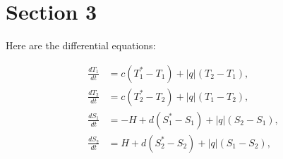 \section{Section 3}

Here are the differential equations:

\begin{equation*}
\begin{split}
\frac{dT_1}{dt} &= c(T_1^* - T_1) + |q| (T_2 - T_1) , \\
\frac{dT_2}{dt} &= c(T_2^* - T_2) + |q| (T_1 - T_2) , \\
\frac{dS_1}{dt} &= -H + d(S_1^* - S_1) + |q| (S_2 - S_1) ,\\
\frac{dS_2}{dt} &= H + d(S_2^* - S_2) + |q| (S_1 - S_2) ,
\end{split}
\end{equation*}